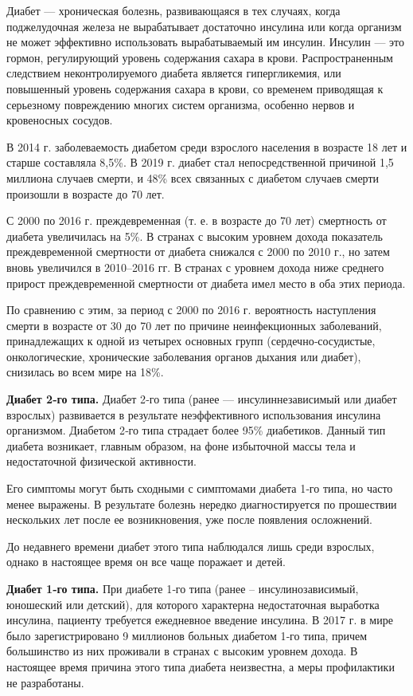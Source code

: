 Диабет — хроническая болезнь, развивающаяся в тех случаях, когда поджелудочная железа не вырабатывает достаточно инсулина или когда организм не может эффективно использовать вырабатываемый им инсулин. Инсулин — это гормон, регулирующий уровень содержания сахара в крови. Распространенным следствием неконтролируемого диабета является гипергликемия, или повышенный уровень содержания сахара в крови, со временем приводящая к серьезному повреждению многих систем организма, особенно нервов и кровеносных сосудов.

В 2014 г. заболеваемость диабетом среди взрослого населения в возрасте 18 лет и старше составляла 8,5\%. В 2019 г. диабет стал непосредственной причиной 1,5 миллиона случаев смерти, и 48\% всех связанных с диабетом случаев смерти произошли в возрасте до 70 лет.

С 2000 по 2016 г. преждевременная (т. е. в возрасте до 70 лет) смертность от диабета увеличилась на 5\%. В странах с высоким уровнем дохода показатель преждевременной смертности от диабета снижался с 2000 по 2010 г., но затем вновь увеличился в 2010–2016 гг. В странах с уровнем дохода ниже среднего прирост преждевременной смертности от диабета имел место в оба этих периода.

По сравнению с этим, за период с 2000 по 2016 г. вероятность наступления смерти в возрасте от 30 до 70 лет по причине неинфекционных заболеваний, принадлежащих к одной из четырех основных групп (сердечно‑сосудистые, онкологические, хронические заболевания органов дыхания или диабет), снизилась во всем мире на 18\%.

\textbf{Диабет 2‑го типа.} Диабет 2‑го типа (ранее — инсулиннезависимый или диабет взрослых) развивается в результате неэффективного использования инсулина организмом. Диабетом 2‑го типа страдает более 95\% диабетиков. Данный тип диабета возникает, главным образом, на фоне избыточной массы тела и недостаточной физической активности.

Его симптомы могут быть сходными с симптомами диабета 1‑го типа, но часто менее выражены. В результате болезнь нередко диагностируется по прошествии нескольких лет после ее возникновения, уже после появления осложнений.

До недавнего времени диабет этого типа наблюдался лишь среди взрослых, однако в настоящее время он все чаще поражает и детей.

\textbf{Диабет 1‑го типа.} При диабете 1‑го типа (ранее – инсулинозависимый, юношеский или детский), для которого характерна недостаточная выработка инсулина, пациенту требуется ежедневное введение инсулина. В 2017 г. в мире было зарегистрировано 9 миллионов больных диабетом 1‑го типа, причем большинство из них проживали в странах с высоким уровнем дохода. В настоящее время причина этого типа диабета неизвестна, а меры профилактики не разработаны.

